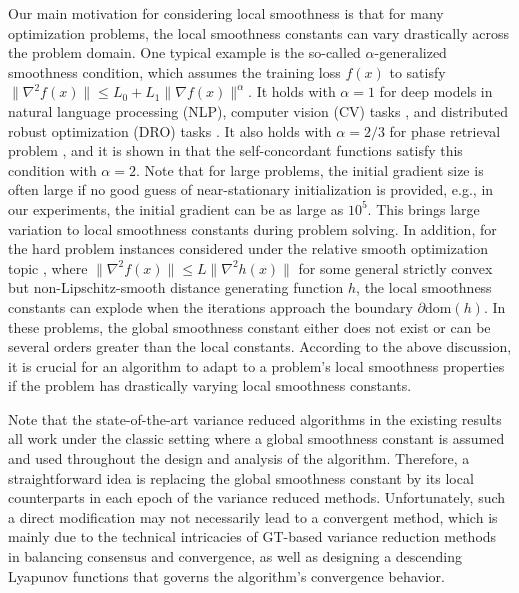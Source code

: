 \documentclass{article}
\begin{document}
Our main motivation for considering local smoothness is that for many optimization problems, the local smoothness constants can vary drastically across the problem domain. One typical example is the so-called $\alpha$-generalized smoothness condition, which assumes the training loss $f(x)$ to satisfy $\|\nabla^2 f(x)\| \leq L_0 + L_1\|\nabla f(x)\|^\alpha.$ It holds with $\alpha = 1$ for deep models in natural language processing (NLP), computer vision (CV) tasks \cite{zhang2019gradient}, and distributed robust optimization (DRO) tasks \cite{jin2021non}. It also holds with $\alpha = 2/3$ for phase retrieval problem \cite{chen2023generalized}, and it is shown in \cite{li2023convex} that the self-concordant functions \cite{nesterov2013introductory} satisfy this condition with $\alpha=2$. Note that for large problems, the initial gradient size is often large if no good guess of near-stationary initialization is provided, e.g., in our experiments, the initial gradient can be as large as $10^5$. This brings large variation to local smoothness constants during problem solving. In addition, for the hard problem instances considered under the relative smooth optimization topic \cite{bolte2018first,lu2018relatively}, where $\|\nabla^2f(x)\|\leq L\|\nabla^2h(x)\|$ for some general strictly convex but non-Lipschitz-smooth distance generating function $h$, the local smoothness constants can explode when the iterations approach the boundary $\partial\mathrm{dom}(h)$. In these problems, the global smoothness constant either does not exist or 
can be several orders greater than the local constants. According to the above discussion, it is crucial for an algorithm to adapt to a problem's local smoothness properties if the problem has drastically varying local smoothness constants. 

Note that the state-of-the-art variance reduced algorithms \cite[etc.]{sun2020improving,xin2020general,xin2020near,xin2020variance,xin2021fast,jiang2022distributed} in the existing results all work under the classic setting where a global smoothness constant is assumed and used throughout the design and analysis of the algorithm.
Therefore, a straightforward idea is  replacing the global smoothness constant by its local counterparts in each epoch of the variance reduced methods. Unfortunately, such a direct modification may not necessarily lead to a convergent method, which is mainly due to the technical intricacies of GT-based variance reduction methods in balancing consensus and convergence, as well as designing a descending Lyapunov functions that governs the algorithm's convergence behavior. 
\end{document}
